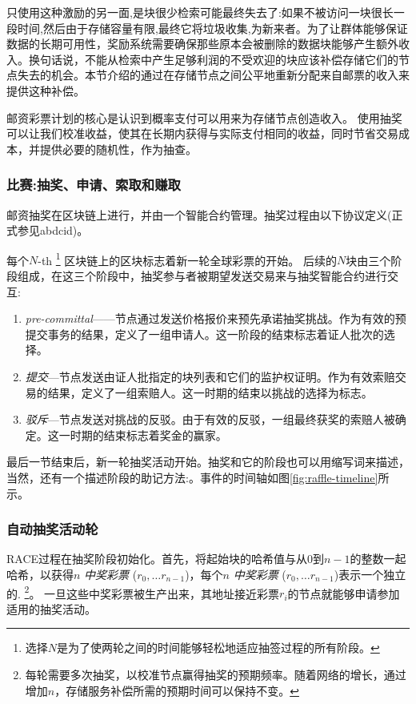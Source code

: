 只使用这种激励的另一面,是块很少检索可能最终失去了:如果不被访问一块很长一段时间,然后由于存储容量有限,最终它将垃圾收集,为新来者。为了让群体能够保证数据的长期可用性，奖励系统需要确保那些原本会被删除的数据块能够产生额外收入。换句话说，不能从检索中产生足够利润的不受欢迎的块应该补偿存储它们的节点失去的机会。本节介绍的通过在存储节点之间公平地重新分配来自邮票的收入来提供这种补偿。



邮资彩票计划的核心是认识到概率支付可以用来为存储节点创造收入。
使用抽奖可以让我们校准收益，使其在长期内获得与实际支付相同的收益，同时节省交易成本，并提供必要的随机性，作为抽查。


\subsubsection{比赛:抽奖、申请、索取和赚取}

邮资抽奖在区块链上进行，并由一个智能合约管理。抽奖过程由以下协议定义(正式参见abdcid)。

每个$N$-th %
%
\footnote{选择$N$是为了使两轮之间的时间能够轻松地适应抽签过程的所有阶段。}
%
区块链上的区块标志着新一轮全球彩票的开始。
后续的$N$块由三个阶段组成，在这三个阶段中，抽奖参与者被期望发送交易来与抽奖智能合约进行交互: 

\begin{enumerate}
\item \emph{pre-committal}——节点通过发送价格报价来预先承诺抽奖挑战。作为有效的预提交事务的结果，定义了一组申请人。这一阶段的结束标志着证人批次的选择。
\item \emph{提交}—节点发送由证人批指定的块列表和它们的监护权证明。作为有效索赔交易的结果，定义了一组索赔人。这一时期的结束以挑战的选择为标志。
\item \emph{驳斥}—节点发送对挑战的反驳。由于有效的反驳，一组最终获奖的索赔人被确定。这一时期的结束标志着奖金的赢家。
\end{enumerate}

最后一节结束后，新一轮抽奖活动开始。抽奖和它的阶段也可以用缩写词来描述，当然，还有一个描述阶段的助记方法:。事件的时间轴如图\ref{fig:raffle-timeline}所示。


\subsubsection{自动抽奖活动轮}

RACE过程在抽奖阶段初始化。首先，将起始块的哈希值与从$0$到$n-1$的整数一起哈希，以获得$n$ \emph{中奖彩票} ($r_0, \ldots r_{n-1}$)，每个$n$ \emph{中奖彩票} ($r_0, \ldots r_{n-1}$)表示一个独立的.%
%
\footnote{每轮需要多次抽奖，以校准节点赢得抽奖的预期频率。随着网络的增长，通过增加$n$，存储服务补偿所需的预期时间可以保持不变。}。 
%
一旦这些中奖彩票被生产出来，其地址接近彩票$r_i$的节点就能够申请参加适用的抽奖活动。


